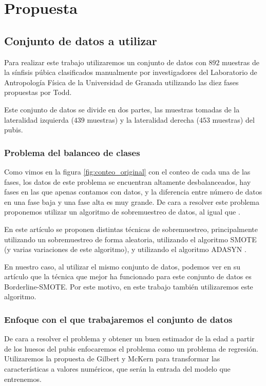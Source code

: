 \section{Propuesta}

\subsection{Conjunto de datos a utilizar}

Para realizar este trabajo utilizaremos un conjunto de datos con $892$ muestras de la sínfisis púbica clasificados manualmente por investigadores del Laboratorio de Antropología Física de la Universidad de Granada utilizando las diez fases propuestas por Todd.

Este conjunto de datos se divide en dos partes, las muestras tomadas de la lateralidad izquierda ($439$ muestras) y la lateralidad derecha ($453$ muestras) del pubis.

\subsubsection{Problema del balanceo de clases}

Como vimos en la figura \ref{fig:conteo_original} con el conteo de cada una de las fases, los datos de este problema se encuentran altamente desbalanceados, hay fases en las que apenas contamos con datos, y la diferencia entre número de datos en una fase baja y una fase alta es muy grande. De cara a resolver este problema proponemos utilizar un algoritmo de sobremuestreo de datos, al igual que  \cite{NSLVOrdAge}.

En este artículo se proponen distintas técnicas de sobremuestreo, principalmente utilizando un sobremuestreo de forma aleatoria, utilizando el algoritmo SMOTE \cite{revisionSMOTE} (y varias variaciones de este algoritmo), y utilizando el algoritmo ADASYN \cite{propuestaADASYN}.

En nuestro caso, al utilizar el mismo conjunto de datos, podemos ver en su artículo que la técnica que mejor ha funcionado para este conjunto de datos es Borderline-SMOTE. Por este motivo, en este trabajo también utilizaremos este algoritmo.

\subsubsection{Enfoque con el que trabajaremos el conjunto de datos}

De cara a resolver el problema y obtener un buen estimador de la edad a partir de los huesos del pubis enfocaremos el problema como un problema de regresión. Utilizaremos la propuesta de Gilbert y McKern para transformar las características a valores numéricos, que serán la entrada del modelo que entrenemos.

